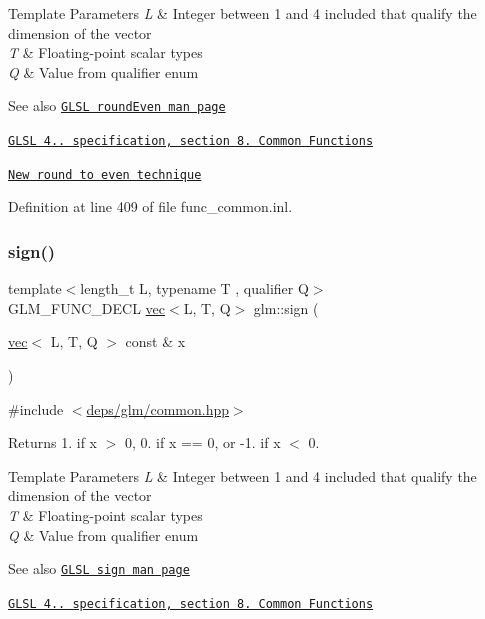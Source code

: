 \begin{DoxyTemplParams}{Template Parameters}
{\em L} & Integer between 1 and 4 included that qualify the dimension of the vector \\
\hline
{\em T} & Floating-\/point scalar types \\
\hline
{\em Q} & Value from qualifier enum\\
\hline
\end{DoxyTemplParams}
\begin{DoxySeeAlso}{See also}
\href{http://www.opengl.org/sdk/docs/manglsl/xhtml/roundEven.xml}{\tt G\+L\+SL round\+Even man page} 

\href{http://www.opengl.org/registry/doc/GLSLangSpec.4.20.8.pdf}{\tt G\+L\+SL 4.. specification, section 8. Common Functions} 

\href{http://developer.amd.com/documentation/articles/pages/New-Round-to-Even-Technique.aspx}{\tt New round to even technique} 
\end{DoxySeeAlso}


Definition at line 409 of file func\+\_\+common.\+inl.

\mbox{\label{group__core__func__common_ga1e2e5cfff800056540e32f6c9b604b28}} 
\subsubsection{\texorpdfstring{sign()}{sign()}}
{\footnotesize\ttfamily template$<$length\+\_\+t L, typename T , qualifier Q$>$ \\
G\+L\+M\+\_\+\+F\+U\+N\+C\+\_\+\+D\+E\+CL \hyperlink{structglm_1_1vec}{vec}$<$L, T, Q$>$ glm\+::sign (\begin{DoxyParamCaption}\item[{\hyperlink{structglm_1_1vec}{vec}$<$ L, T, Q $>$ const \&}]{x }\end{DoxyParamCaption})}



{\ttfamily \#include $<$\hyperlink{common_8hpp}{deps/glm/common.\+hpp}$>$}

Returns 1. if x $>$ 0, 0. if x == 0, or -\/1. if x $<$ 0.


\begin{DoxyTemplParams}{Template Parameters}
{\em L} & Integer between 1 and 4 included that qualify the dimension of the vector \\
\hline
{\em T} & Floating-\/point scalar types \\
\hline
{\em Q} & Value from qualifier enum\\
\hline
\end{DoxyTemplParams}
\begin{DoxySeeAlso}{See also}
\href{http://www.opengl.org/sdk/docs/manglsl/xhtml/sign.xml}{\tt G\+L\+SL sign man page} 

\href{http://www.opengl.org/registry/doc/GLSLangSpec.4.20.8.pdf}{\tt G\+L\+SL 4.. specification, section 8. Common Functions} 
\end{DoxySeeAlso}


